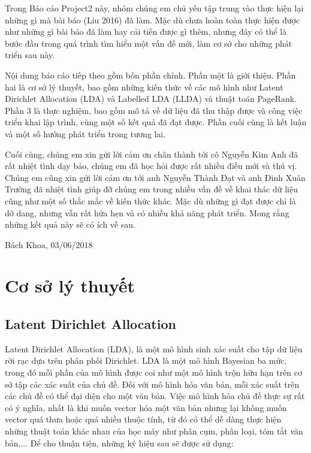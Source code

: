 \documentclass[12pt,a4paper]{article}
\begin{document}
Trong Báo cáo Project2 này, nhóm chúng em chủ yếu tập trung vào thực hiện lại những gì mà bài báo (Liu 2016) đã làm. Mặc dù chưa hoàn toàn thực hiện được như những gì bài báo đã làm hay cải tiến được gì thêm, nhưng đây có thể là bước đầu trong quá trình tìm hiểu một vấn đề mới, làm cơ sở cho những phát triển sau này.


Nội dung báo cáo tiếp theo gồm bốn phần chính. Phần một là giới thiệu. Phần hai là cơ sở lý thuyết, bao gồm những kiến thức về các mô hình như Latent Dirichlet Allocation (LDA) và Labelled LDA (LLDA) và thuật toán PageRank. Phần 3 là thực nghiệm, bao gồm mô tả về dữ liệu đã thu thập được và công việc triển khai lập trình, cùng một số kết quả đã đạt được. Phần cuối cùng là kết luận và một số hướng phát triển trong tương lai.


Cuối cùng, chúng em xin gửi lời cảm ơn chân thành tới cô Nguyễn Kim Anh đã rất nhiệt tình dạy bảo, chúng em đã học hỏi được rất nhiều điều mới và thú vị. Chúng em cũng xin gửi lời cảm ơn tới anh Nguyễn Thành Đạt và anh Đinh Xuân Trường đã nhiệt tình giúp đỡ chúng em trong nhiều vấn đề về khai thác dữ liệu cũng như một số thắc mắc về kiến thức khác. Mặc dù những gì đạt được chỉ là dở dang, nhưng vẫn rất hứa hẹn và có nhiều khả năng phát triển. Mong rằng những kết quả này sẽ có ích về sau.


\vspace{1.3cm}
\hspace{9.5cm} Bách Khoa, 03/06/2018


\newpage
\section{Cơ sở lý thuyết}

\subsection{Latent Dirichlet Allocation}
Latent Dirichlet Allocation (LDA), là một mô hình sinh xác suất cho tập dữ liệu rời rạc dựa trên phân phối Dirichlet. LDA là một mô hình Bayesian ba mức, trong đó mỗi phần của mô hình được coi như một mô hình trộn hữu hạn trên cơ sở tập các xác suất của chủ đề. Đối với mô hình hóa văn bản, mỗi xác suất trên các chủ đề có thể đại diện cho một văn bản. Việc mô hình hóa chủ đề thực sự rất có ý nghĩa, nhất là khi muốn vector hóa một văn bản nhưng lại không muốn vector quá thưa hoặc quá nhiều thuộc tính, từ đó có thể dễ dàng thực hiện những thuật toán khác nhau của học máy như phân cụm, phân loại, tóm tắt văn bản,... Để cho thuận tiện, những ký hiệu sau sẽ được sử dụng:
\end{document}
